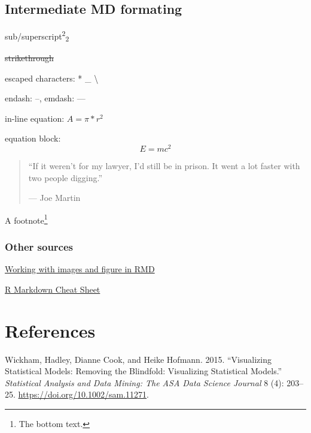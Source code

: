 \documentclass[11,]{article}
\let\rmarkdownfootnote\footnote%
\def\footnote{\protect\rmarkdownfootnote}
\begin{document}
\hypertarget{intermediate-md-formating}{%
\subsection{Intermediate MD formating}\label{intermediate-md-formating}}

sub/superscript\textsuperscript{2}\textsubscript{2}

\sout{strikethrough}

escaped characters: * \_ \textbackslash{}

endash: --, emdash: ---

in-line equation: \(A = \pi*r^{2}\)

equation block: \[E = mc^{2}\]

\begin{quote}
``If it weren't for my lawyer, I'd still be in prison.
It went a lot faster with two people digging.''

\hfill --- Joe Martin
\end{quote}

A footnote\footnote{The bottom text.}

\hypertarget{other-sources}{%
\subsubsection{Other sources}\label{other-sources}}

\href{http://zevross.com/blog/2017/06/19/tips-and-tricks-for-working-with-images-and-figures-in-r-markdown-documents/}{Working with images and figure in RMD}

\href{https://rstudio.com/wp-content/uploads/2016/03/rmarkdown-cheatsheet-2.0.pdf}{R Markdown Cheat Sheet}

\hypertarget{references}{%
\section*{References}\label{references}}

\hypertarget{refs}{}
\leavevmode\hypertarget{ref-wickham_visualizing_2015}{}%
Wickham, Hadley, Dianne Cook, and Heike Hofmann. 2015. ``Visualizing Statistical Models: Removing the Blindfold: Visualizing Statistical Models.'' \emph{Statistical Analysis and Data Mining: The ASA Data Science Journal} 8 (4): 203--25. \url{https://doi.org/10.1002/sam.11271}.
\end{document}
